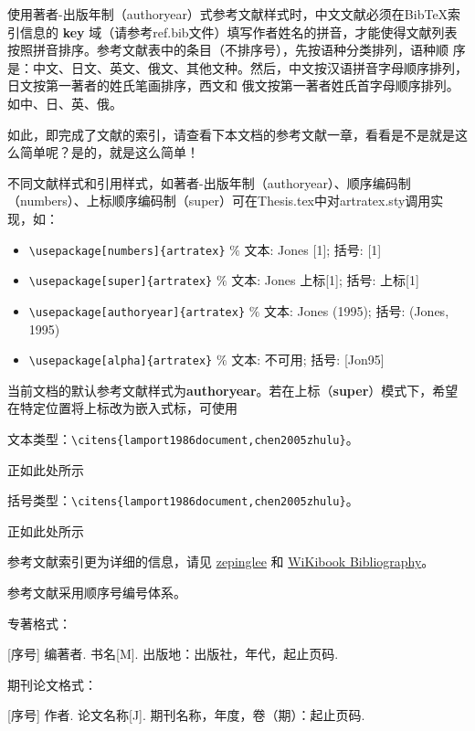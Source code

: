 使用著者-出版年制（authoryear）式参考文献样式时，中文文献必须在BibTeX索引信息的 \textbf{key} 域（请参考ref.bib文件）填写作者姓名的拼音，才能使得文献列表按照拼音排序。参考文献表中的条目（不排序号），先按语种分类排列，语种顺 序是：中文、日文、英文、俄文、其他文种。然后，中文按汉语拼音字母顺序排列，日文按第一著者的姓氏笔画排序，西文和 俄文按第一著者姓氏首字母顺序排列。如中\cite{niu2013zonghe}、日\cite{Bohan1928}、英\cite{stamerjohanns2009mathml}、俄\cite{Dubrovin1906}。

如此，即完成了文献的索引，请查看下本文档的参考文献一章，看看是不是就是这么简单呢？是的，就是这么简单！

不同文献样式和引用样式，如著者-出版年制（authoryear）、顺序编码制（numbers）、上标顺序编码制（super）可在Thesis.tex中对artratex.sty调用实现，如：
\begin{itemize}
    \footnotesize
    \item \verb+\usepackage[numbers]{artratex}+ $\%$ 文本: Jones [1]; 括号: [1]
    \item \verb+\usepackage[super]{artratex}+ $\%$ 文本: Jones 上标[1]; 括号: 上标[1]
    \item \verb+\usepackage[authoryear]{artratex}+ $\%$ 文本: Jones (1995); 括号: (Jones, 1995)
    \item \verb+\usepackage[alpha]{artratex}+ $\%$ 文本: 不可用; 括号: [Jon95]
\end{itemize}

当前文档的默认参考文献样式为\textbf{authoryear}。若在上标（\textbf{super}）模式下，希望在特定位置将上标改为嵌入式标，可使用

文本类型：\verb|\citens{lamport1986document,chen2005zhulu}|。

正如此处所示\cite{lamport1986document,chen2005zhulu}

括号类型：\verb|\citens{lamport1986document,chen2005zhulu}|。

正如此处所示\cite{lamport1986document,chen2005zhulu}

参考文献索引更为详细的信息，请见 \href{https://github.com/zepinglee/gbt7714-bibtex-style}{zepinglee} 和 \href{https://en.wikibooks.org/wiki/LaTeX/Bibliography_Management}{WiKibook Bibliography}。


参考文献采用顺序号编号体系。

专著格式： 

[序号] 编著者. 书名[M]. 出版地：出版社，年代，起止页码.

期刊论文格式： 

[序号] 作者. 论文名称[J]. 期刊名称，年度，卷（期）：起止页码.

